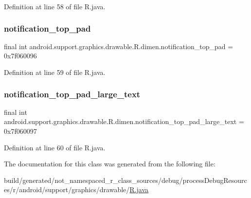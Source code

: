 Definition at line 58 of file R.\+java.

\mbox{\label{classandroid_1_1support_1_1graphics_1_1drawable_1_1_r_1_1dimen_a97a335d4f70bf2b2739f6c34c4e82100}} 
\subsubsection{\texorpdfstring{notification\_top\_pad}{notification\_top\_pad}}
{\footnotesize\ttfamily final int android.\+support.\+graphics.\+drawable.\+R.\+dimen.\+notification\+\_\+top\+\_\+pad = 0x7f060096\hspace{0.3cm}{\ttfamily [static]}}



Definition at line 59 of file R.\+java.

\mbox{\label{classandroid_1_1support_1_1graphics_1_1drawable_1_1_r_1_1dimen_a13b91dd416c56f3d0671a35a8cde2614}} 
\subsubsection{\texorpdfstring{notification\_top\_pad\_large\_text}{notification\_top\_pad\_large\_text}}
{\footnotesize\ttfamily final int android.\+support.\+graphics.\+drawable.\+R.\+dimen.\+notification\+\_\+top\+\_\+pad\+\_\+large\+\_\+text = 0x7f060097\hspace{0.3cm}{\ttfamily [static]}}



Definition at line 60 of file R.\+java.



The documentation for this class was generated from the following file\+:\begin{DoxyCompactItemize}
\item 
build/generated/not\+\_\+namespaced\+\_\+r\+\_\+class\+\_\+sources/debug/process\+Debug\+Resources/r/android/support/graphics/drawable/\mbox{\hyperlink{android_2support_2graphics_2drawable_2_r_8java}{R.\+java}}\end{DoxyCompactItemize}
